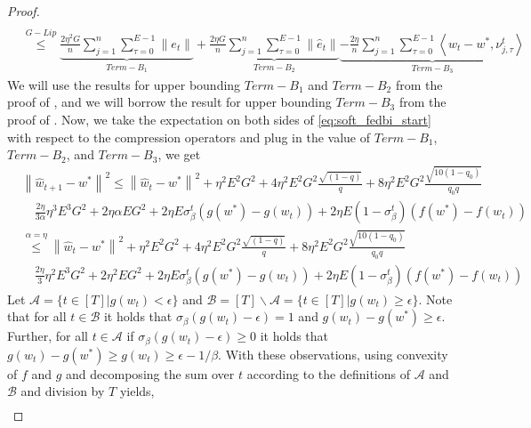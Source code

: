 \documentclass{article} %
\def\A{{\mathcal A}}
\def\B{{\mathcal B}}
\begin{document}
\begin{proof}
\begin{align*}
    \\
    &\overset{G-Lip}{\leq}\underbrace{\frac{2 \eta^2 G}{n} \sum_{j=1}^n  \sum_{\tau=0}^{E-1}\|e_t\|}_{Term-B_1} + \underbrace{\frac{2 \eta G}{n} \sum_{j=1}^n  \sum_{\tau=0}^{E-1}\|\hat{e}_t\|}_{Term-B_2} \underbrace{- \frac{2 \eta}{n} \sum_{j=1}^n  \sum_{\tau=0}^{E-1} \left \langle w_t - w^*,  \nu_{j,\tau}^t \right \rangle}_{Term-B_3}
\end{align*}
We will use the results for upper bounding $Term-B_1$ and $Term-B_2$ from the proof of , and we will borrow the result for upper bounding $Term-B_3$ from the proof of . Now, we take the expectation on both sides of \cref{eq:soft_fedbi_start} with respect to the compression operators and plug in the value of $Term-B_1$, $Term-B_2$, and $Term-B_3$, we get
\begin{equation}
\label{eq:fedbisgcm_soft}
    \begin{aligned}
        &\left\| \hat{w}_{t+1} - w^* \right\|^2 \leq \left\| \hat{w}_t - w^* \right\|^2 + \eta^2E^2G^2  + 4\eta^2E^2G^2\frac{\sqrt{(1-q)}}{q} + 8\eta^2 E^2 G^2 \frac{\sqrt{10(1-q_0)}}{q_0q}
        \\
        & \quad \frac{2\eta}{3\alpha} \eta^3E^3G^2 + 2\eta \alpha E G^2 + 2\eta E \sigma_{\beta}^t \left( g(w^*) - g(w_t) \right) + 2\eta E (1 - \sigma_{\beta}^t) \left( f(w^*) - f(w_t) \right)
        \\
        &\overset{\alpha = \eta}{\leq}\left\| \hat{w}_t - w^* \right\|^2 + \eta^2E^2G^2  + 4\eta^2E^2G^2\frac{\sqrt{(1-q)}}{q} + 8\eta^2 E^2 G^2 \frac{\sqrt{10(1-q_0)}}{q_0q}
        \\
        & \quad \frac{2\eta}{3} \eta^2E^3G^2 + 2\eta^2 E G^2 + 2\eta E \sigma_{\beta}^t \left( g(w^*) - g(w_t) \right) + 2\eta E (1 - \sigma_{\beta}^t) \left( f(w^*) - f(w_t) \right)
        \end{aligned}
\end{equation}
Let $\A = \{t\in [T]| g(w_t)< \epsilon\}$ and $\B = [T]\backslash \A = \{t\in [T]| g(w_t)\geq \epsilon\}$. Note that for all $t\in \B$ it holds that $\sigma_\beta(g(w_t)-\epsilon) = 1$ and $g(w_t)-g(w^\ast)\geq \epsilon$. Further, for all $t\in \A$ if $\sigma_\beta(g(w_t)-\epsilon) \geq 0$ it holds that $g(w_t)-g(w^\ast)\geq g(w_t)\geq\epsilon -1/\beta$. With these observations, using convexity of $f$ and $g$ and decomposing the sum over $t$ according to the definitions of $\A$ and $\B$ and division by $T$ yields,
\begin{equation*}
    \begin{aligned}

\end{aligned}
\end{equation*}
\end{proof}
\end{document}
